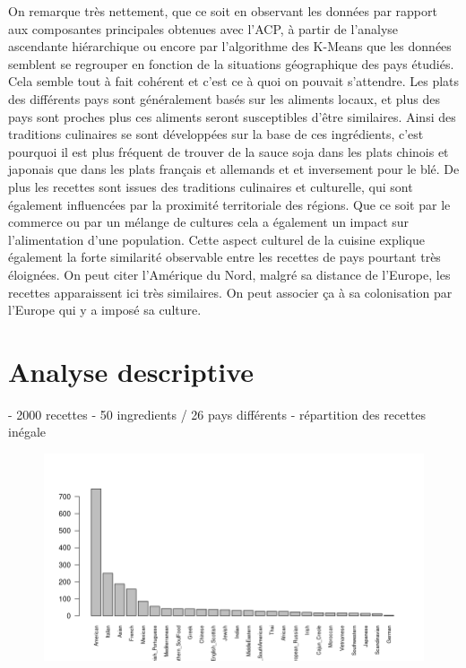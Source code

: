 \documentclass[a4paper, titlepage]{report}
\begin{document}
On remarque très nettement, que ce soit en observant les données par rapport aux composantes principales obtenues avec l'ACP, à partir de l'analyse ascendante hiérarchique ou encore par l'algorithme des K-Means que les données semblent se regrouper en fonction de la situations géographique des pays étudiés. Cela semble tout à fait cohérent et c'est ce à quoi on pouvait s'attendre.
Les plats des différents pays sont généralement basés sur les aliments locaux, et plus des pays sont proches plus ces aliments seront susceptibles d'être similaires. Ainsi des traditions culinaires se sont développées sur la base de ces ingrédients, c'est pourquoi il est plus fréquent de trouver de la sauce soja dans les plats chinois et japonais que dans les plats français et allemands et et inversement pour le blé.
De plus les recettes sont issues des traditions culinaires et culturelle, qui sont également influencées par la proximité territoriale des régions. Que ce soit par le commerce ou par un mélange de cultures cela a également un impact sur l'alimentation d'une population. Cette aspect culturel de la cuisine explique également la forte similarité observable entre les recettes de pays pourtant très éloignées. On peut citer l'Amérique du Nord, malgré sa distance de l'Europe, les recettes apparaissent ici très similaires. On peut associer ça à sa colonisation par l'Europe qui y a imposé sa culture.


\section{Analyse descriptive}

- 2000 recettes
- 50 ingredients / 26 pays différents
- répartition des recettes inégale

\begin{figure}[h]
	\begin{center}
		\includegraphics[scale = 0.32]{./doc/nombre-recettes.png}
	\end{center}
\end{figure}
\end{document}
